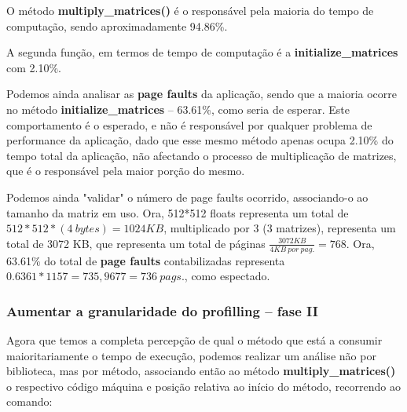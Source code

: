 \documentclass[conference,compsoc]{IEEEtran}
\begin{document}
                                                                                                                                                                                                                       O método \textbf{multiply\_matrices()} é o responsável pela maioria do tempo de computação, sendo aproximadamente 94.86\%. \par A segunda função, em termos de tempo de computação é a \textbf{initialize\_matrices} com 2.10\%. \par 
                                                                                                                                                                                                                       Podemos ainda analisar as \textbf{page faults} da aplicação, sendo que a maioria ocorre no método \textbf{initialize\_matrices} -- 63.61\%, como seria de esperar. Este comportamento é o esperado, e não é responsável por qualquer problema de performance da aplicação, dado que esse mesmo método apenas ocupa 2.10\% do tempo total da aplicação, não afectando o processo de multiplicação de matrizes, que é o responsável pela maior porção do mesmo.\par 
                                                                                                                                                                                                                       Podemos ainda "validar" o número de page faults ocorrido, associando-o ao tamanho da matriz em uso. Ora, 512*512 floats representa um total de $512*512*(4\ bytes) = 1024KB $, multiplicado por 3 (3 matrizes), representa um total de 3072 KB, que representa um total de páginas $\frac{3072KB}{4KB\ por\ pag.} = 768$. Ora, 63.61\% do total de \textbf{page faults} contabilizadas representa $0.6361 * 1157 = 735,9677 = 736\ pags.$, como espectado.

                                                                                                                                                                                                                       \subsubsection{Aumentar a granularidade do profilling -- fase II}
                                                                                                                                                                                                                       Agora que temos a completa percepção de qual o método que está a consumir maioritariamente o tempo de execução, podemos realizar um análise não por biblioteca, mas por método, associando então ao método \textbf{multiply\_matrices()} o respectivo código máquina e posição relativa ao início do método, recorrendo ao comando:
\end{document}
